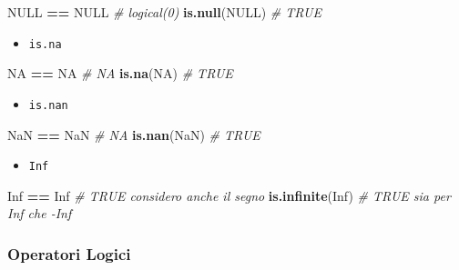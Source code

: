 \documentclass[
]{book}
\newenvironment{Shaded}{\begin{snugshade}}{\end{snugshade}}
\newcommand{\CommentTok}[1]{\textcolor[rgb]{0.56,0.35,0.01}{\textit{#1}}}
\newcommand{\KeywordTok}[1]{\textcolor[rgb]{0.13,0.29,0.53}{\textbf{#1}}}
\newcommand{\NormalTok}[1]{#1}
\newcommand{\OperatorTok}[1]{\textcolor[rgb]{0.81,0.36,0.00}{\textbf{#1}}}
\newcommand{\OtherTok}[1]{\textcolor[rgb]{0.56,0.35,0.01}{#1}}
\newcommand{\StringTok}[1]{\textcolor[rgb]{0.31,0.60,0.02}{#1}}
\providecommand{\tightlist}{%
  \setlength{\itemsep}{0pt}\setlength{\parskip}{0pt}}
\begin{document}
\begin{Shaded}
\begin{Highlighting}[]
\OtherTok{NULL} \OperatorTok{==}\StringTok{ }\OtherTok{NULL}     \CommentTok{# logical(0)}
\KeywordTok{is.null}\NormalTok{(}\OtherTok{NULL}\NormalTok{)    }\CommentTok{# TRUE}
\end{Highlighting}
\end{Shaded}

\begin{itemize}
\tightlist
\item
  \texttt{is.na}
\end{itemize}

\begin{Shaded}
\begin{Highlighting}[]
\OtherTok{NA} \OperatorTok{==}\StringTok{ }\OtherTok{NA}    \CommentTok{# NA}
\KeywordTok{is.na}\NormalTok{(}\OtherTok{NA}\NormalTok{)   }\CommentTok{# TRUE}
\end{Highlighting}
\end{Shaded}

\begin{itemize}
\tightlist
\item
  \texttt{is.nan}
\end{itemize}

\begin{Shaded}
\begin{Highlighting}[]
\OtherTok{NaN} \OperatorTok{==}\StringTok{ }\OtherTok{NaN}  \CommentTok{# NA}
\KeywordTok{is.nan}\NormalTok{(}\OtherTok{NaN}\NormalTok{) }\CommentTok{# TRUE}
\end{Highlighting}
\end{Shaded}

\begin{itemize}
\tightlist
\item
  \texttt{Inf}
\end{itemize}

\begin{Shaded}
\begin{Highlighting}[]
\OtherTok{Inf} \OperatorTok{==}\StringTok{ }\OtherTok{Inf}       \CommentTok{# TRUE considero anche il segno}
\KeywordTok{is.infinite}\NormalTok{(}\OtherTok{Inf}\NormalTok{) }\CommentTok{# TRUE sia per Inf che -Inf}
\end{Highlighting}
\end{Shaded}

\hypertarget{operatori-logici-1}{%
\subsubsection*{Operatori Logici}\label{operatori-logici-1}}
\end{document}
